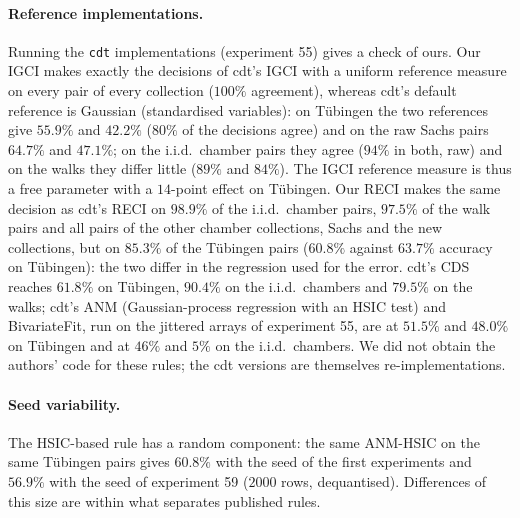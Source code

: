 \paragraph{Reference implementations.} Running the \texttt{cdt} implementations (experiment 55) gives a check of ours. Our IGCI makes exactly the decisions of cdt's IGCI with a uniform reference measure on every pair of every collection ($100\%$ agreement), whereas cdt's default reference is Gaussian (standardised variables): on T\"ubingen the two references give $55.9\%$ and $42.2\%$ ($80\%$ of the decisions agree) and on the raw Sachs pairs $64.7\%$ and $47.1\%$; on the i.i.d.\ chamber pairs they agree ($94\%$ in both, raw) and on the walks they differ little ($89\%$ and $84\%$). The IGCI reference measure is thus a free parameter with a $14$-point effect on T\"ubingen. Our RECI makes the same decision as cdt's RECI on $98.9\%$ of the i.i.d.\ chamber pairs, $97.5\%$ of the walk pairs and all pairs of the other chamber collections, Sachs and the new collections, but on $85.3\%$ of the T\"ubingen pairs ($60.8\%$ against $63.7\%$ accuracy on T\"ubingen): the two differ in the regression used for the error. cdt's CDS reaches $61.8\%$ on T\"ubingen, $90.4\%$ on the i.i.d.\ chambers and $79.5\%$ on the walks; cdt's ANM (Gaussian-process regression with an HSIC test) and BivariateFit, run on the jittered arrays of experiment 55, are at $51.5\%$ and $48.0\%$ on T\"ubingen and at $46\%$ and $5\%$ on the i.i.d.\ chambers. We did not obtain the authors' code for these rules; the cdt versions are themselves re-implementations.

\paragraph{Seed variability.} The HSIC-based rule has a random component: the same ANM-HSIC on the same T\"ubingen pairs gives $60.8\%$ with the seed of the first experiments and $56.9\%$ with the seed of experiment 59 ($2000$ rows, dequantised). Differences of this size are within what separates published rules.
